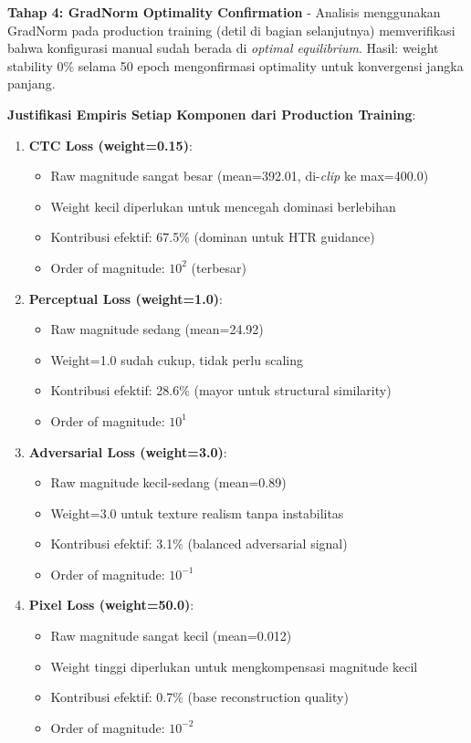 \documentclass[12pt,a4paper]{article}
\begin{document}
\textbf{Tahap 4: GradNorm Optimality Confirmation} - Analisis menggunakan GradNorm pada production training (detil di bagian selanjutnya) memverifikasi bahwa konfigurasi manual sudah berada di \textit{optimal equilibrium}. Hasil: weight stability 0\% selama 50 epoch mengonfirmasi optimality untuk konvergensi jangka panjang.

\textbf{Justifikasi Empiris Setiap Komponen dari Production Training}:

\begin{enumerate}[leftmargin=*]
    \item \textbf{CTC Loss (weight=0.15)}:
    \begin{itemize}
        \item Raw magnitude sangat besar (mean=392.01, di-\textit{clip} ke max=400.0)
        \item Weight kecil diperlukan untuk mencegah dominasi berlebihan
        \item Kontribusi efektif: 67.5\% (dominan untuk HTR guidance)
        \item Order of magnitude: $10^2$ (terbesar)
    \end{itemize}
    
    \item \textbf{Perceptual Loss (weight=1.0)}:
    \begin{itemize}
        \item Raw magnitude sedang (mean=24.92)
        \item Weight=1.0 sudah cukup, tidak perlu scaling
        \item Kontribusi efektif: 28.6\% (mayor untuk structural similarity)
        \item Order of magnitude: $10^1$
    \end{itemize}
    
    \item \textbf{Adversarial Loss (weight=3.0)}:
    \begin{itemize}
        \item Raw magnitude kecil-sedang (mean=0.89)
        \item Weight=3.0 untuk texture realism tanpa instabilitas
        \item Kontribusi efektif: 3.1\% (balanced adversarial signal)
        \item Order of magnitude: $10^{-1}$
    \end{itemize}
    
    \item \textbf{Pixel Loss (weight=50.0)}:
    \begin{itemize}
        \item Raw magnitude sangat kecil (mean=0.012)
        \item Weight tinggi diperlukan untuk mengkompensasi magnitude kecil
        \item Kontribusi efektif: 0.7\% (base reconstruction quality)
        \item Order of magnitude: $10^{-2}$
    \end{itemize}
    

\end{enumerate}
\end{document}
